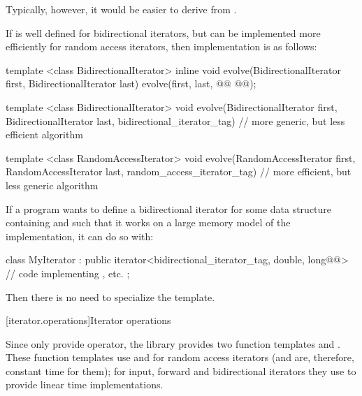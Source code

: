 Typically, however, it would be easier to derive
from
.
\exitexample

\pnum
\enterexample
If
is well defined for bidirectional iterators, but can be implemented more
efficiently for random access iterators, then  implementation is as
follows:

\begin{codeblock}
template <class BidirectionalIterator>
inline void
evolve(BidirectionalIterator first, BidirectionalIterator last) {
  evolve(first, last,
    @@
    @@);
}

template <class BidirectionalIterator>
void evolve(BidirectionalIterator first, BidirectionalIterator last,
  bidirectional_iterator_tag) {
  // more generic, but less efficient algorithm
}

template <class RandomAccessIterator>
void evolve(RandomAccessIterator first, RandomAccessIterator last,
  random_access_iterator_tag) {
  // more efficient, but less generic algorithm
}
\end{codeblock}
\exitexample

\pnum
\enterexample
If a \Cpp program wants to define a bidirectional iterator for some data structure containing
and such that it
works on a large memory model of the implementation, it can do so with:

\begin{codeblock}
class MyIterator :
  public iterator<bidirectional_iterator_tag, double, long@@> {
  // code implementing \tcode{++}, etc.
};
\end{codeblock}

\pnum
Then there is no need to specialize the
\added{, }
  template.
\exitexample

[iterator.operations]{Iterator operations}

\pnum
Since only  provide
\tcode{+} 
\tcode{-}
operator, the library provides two
function templates
and
.
These
function templates
use
\tcode{+}
and
\tcode{-}
for random access iterators (and are, therefore, constant
time for them); for input, forward and bidirectional iterators they use
\tcode{++}
to provide linear time
implementations.

